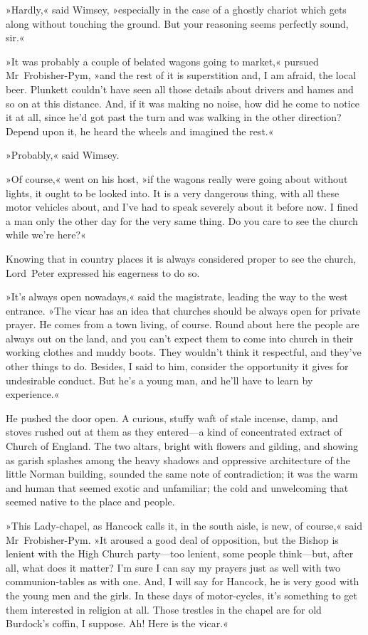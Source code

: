 »Hardly,« said Wimsey, »especially in the case of a ghostly chariot which gets along without touching the ground. But your reasoning seems perfectly sound, sir.«

»It was probably a couple of belated wagons going to market,« pursued Mr~Frobisher-Pym, »and the rest of it is superstition and, I am afraid, the local beer. Plunkett couldn't have seen all those details about drivers and hames and so on at this distance. And, if it was making no noise, how did he come to notice it at all, since he'd got past the turn and was walking in the other direction? Depend upon it, he heard the wheels and imagined the rest.«

»Probably,« said Wimsey.

»Of course,« went on his host, »if the wagons really were going about without lights, it ought to be looked into. It is a very dangerous thing, with all these motor vehicles about, and I've had to speak severely about it before now. I fined a man only the other day for the very same thing. Do you care to see the church while we're here?«

Knowing that in country places it is always considered proper to see the church, Lord~Peter expressed his eagerness to do so.

»It's always open nowadays,« said the magistrate, leading the way to the west entrance. »The vicar has an idea that churches should be always open for private prayer. He comes from a town living, of course. Round about here the people are always out on the land, and you can't expect them to come into church in their working clothes and muddy boots. They wouldn't think it respectful, and they've other things to do. Besides, I said to him, consider the opportunity it gives for undesirable conduct. But he's a young man, and he'll have to learn by experience.«

He pushed the door open. A curious, stuffy waft of stale incense, damp, and stoves rushed out at them as they entered—a kind of concentrated extract of Church of England. The two altars, bright with flowers and gilding, and showing as garish splashes among the heavy shadows and oppressive architecture of the little Norman building, sounded the same note of contradiction; it was the warm and human that seemed exotic and unfamiliar; the cold and unwelcoming that seemed native to the place and people.

»This Lady-chapel, as Hancock calls it, in the south aisle, is new, of course,« said Mr~Frobisher-Pym. »It aroused a good deal of opposition, but the Bishop is lenient with the High Church party—too lenient, some people think—but, after all, what does it matter? I'm sure I can say my prayers just as well with two communion-tables as with one. And, I will say for Hancock, he is very good with the young men and the girls. In these days of motor-cycles, it's something to get them interested in religion at all. Those trestles in the chapel are for old Burdock's coffin, I suppose. Ah! Here is the vicar.«

